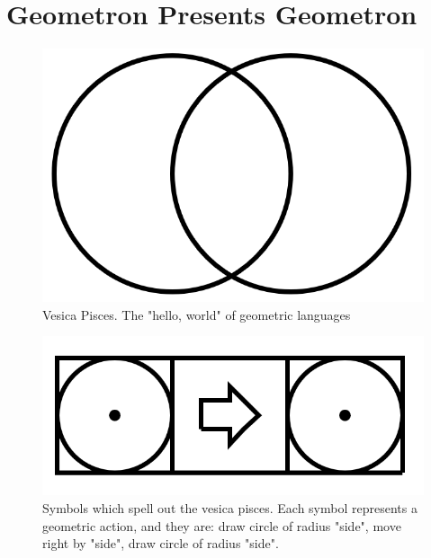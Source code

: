 \documentclass[11pt]{article}
\begin{document}
\section{
Geometron Presents Geometron}

\begin{figure}

\includegraphics[width=\linewidth]{../figures/vesica.png}

\caption{Vesica Pisces.  The "hello, world" of geometric languages}
\end{figure}


\begin{figure}

\includegraphics[width=\linewidth]{../figures/vesicacode.png}

\caption{Symbols which spell out the vesica pisces. Each symbol represents a geometric action, and they are: draw circle of radius "side", move right by "side", draw circle of radius "side".}
\end{figure}
\end{document}
